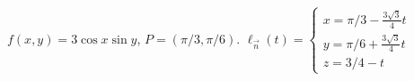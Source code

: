 {$f(x,y) = 3\cos x\sin y$,   $P=(\pi/3, \pi/6)$.
}
{
$\ell_{\vec n}(t) = \left\{\begin{array}{l} x = \pi/3-\frac{3\sqrt{3}}{4}t\\ y = \pi/6+\frac{3\sqrt{3}}{4}t \\ z = 3/4 -t \end{array} \right.$ 
}